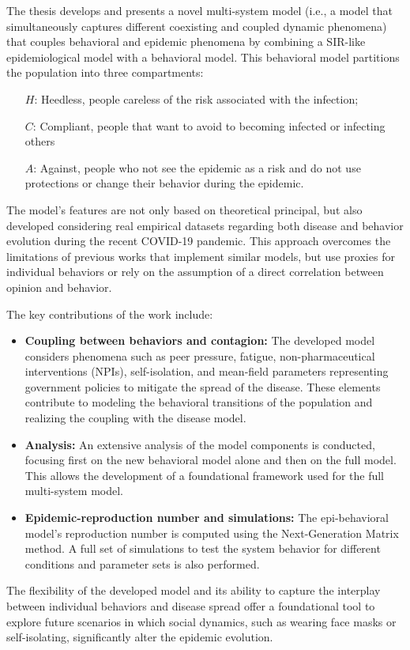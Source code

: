 The thesis develops and presents a novel multi-system model (i.e., a model that simultaneously captures different coexisting and coupled dynamic phenomena) that couples behavioral and epidemic phenomena by combining a SIR-like epidemiological model with a behavioral model. This behavioral model partitions the population into three compartments: \begin{itemize}
	\item[$H$:] Heedless, people careless of the risk associated with the infection;
	\item[$C$:] Compliant, people that want to avoid to becoming infected or infecting others
	\item[$A$:] Against, people who not see the epidemic as a risk and do not use protections or change their behavior during the epidemic. 
\end{itemize}

 The model's features are not only based on theoretical principal, but also developed considering real empirical datasets regarding both disease and behavior evolution during the recent COVID-19 pandemic. This approach overcomes the limitations of previous works that implement similar models, but use proxies for individual behaviors or rely on the assumption of a direct correlation between opinion and behavior.

The key contributions of the work include:
\begin{itemize}
	\item \textbf{Coupling between behaviors and contagion:} The developed model considers phenomena such as peer pressure, fatigue, non-pharmaceutical interventions (NPIs), self-isolation, and mean-field parameters representing government policies to mitigate the spread of the disease. These elements contribute to modeling the behavioral transitions of the population and realizing the coupling with the disease model.
	\item \textbf{Analysis:} An extensive analysis of the model components is conducted, focusing first on the new behavioral model alone and then on the full model. This allows the development of a foundational framework used for the full multi-system model.
	\item \textbf{Epidemic-reproduction number and simulations:} The epi-behavioral model's reproduction number is computed using the Next-Generation Matrix method. A full set of simulations to test the system behavior for different conditions and parameter sets is also performed.
\end{itemize}
The flexibility of the developed model and its ability to capture the interplay between individual behaviors and disease spread offer a foundational tool to explore future scenarios in which social dynamics, such as wearing face masks or self-isolating, significantly alter the epidemic evolution.